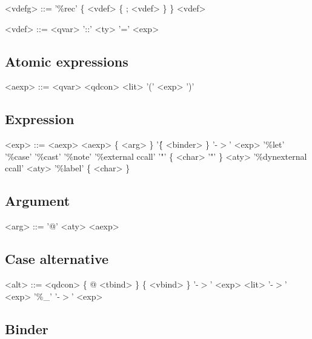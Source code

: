 \begin{grammar}
<vdefg> ::= '\%rec' \{ <vdef> \{ ; <vdef> \} \}
       \alt <vdef>
\end{grammar}

\begin{grammar}
<vdef> ::= <qvar> '::' <ty> '=' <exp>
\end{grammar}

\subsection*{Atomic expressions}

\begin{grammar}
<aexp> ::= <qvar>
      \alt <qdcon>
      \alt <lit>
      \alt '(' <exp> ')'
\end{grammar}

\subsection*{Expression}

\begin{grammar}
<exp> ::= <aexp>
     \alt <aexp> \{ <arg> \}
     \alt '\' \{ <binder> \} '-$>$' <exp>
     \alt '\%let' 
     \alt '\%case'
     \alt '\%cast'
     \alt '\%note'
     \alt '\%external ccall' '"' \{ <char> '"' \} <aty>
     \alt '\%dynexternal ccall' <aty>
     \alt '\%label' \{ <char> \}
\end{grammar}

\subsection*{Argument}

\begin{grammar}
<arg> ::= '@' <aty>
     \alt <aexp>
\end{grammar}

\subsection*{Case alternative}

\begin{grammar}
<alt> ::= <qdcon> \{ @ <tbind> \} \{ <vbind> \} '-$>$' <exp>
     \alt <lit> '-$>$' <exp>
     \alt '\%\_' '-$>$' <exp>
\end{grammar}

\subsection*{Binder}

